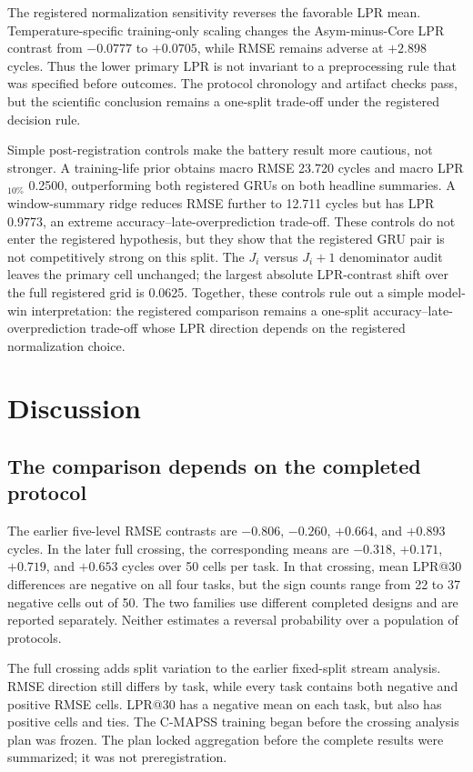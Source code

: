 \documentclass[preprint,12pt,numbers,sort&compress]{elsarticle}
\begin{document}
The registered normalization sensitivity reverses the favorable LPR mean. Temperature-specific training-only scaling changes the Asym-minus-Core LPR contrast from $-0.0777$ to $+0.0705$, while RMSE remains adverse at $+2.898$ cycles. Thus the lower primary LPR is not invariant to a preprocessing rule that was specified before outcomes. The protocol chronology and artifact checks pass, but the scientific conclusion remains a one-split trade-off under the registered decision rule.

Simple post-registration controls make the battery result more cautious, not stronger. A training-life prior obtains macro RMSE 23.720 cycles and macro LPR$_{10\%}$ 0.2500, outperforming both registered GRUs on both headline summaries. A window-summary ridge reduces RMSE further to 12.711 cycles but has LPR 0.9773, an extreme accuracy--late-overprediction trade-off. These controls do not enter the registered hypothesis, but they show that the registered GRU pair is not competitively strong on this split. The $J_i$ versus $J_i+1$ denominator audit leaves the primary cell unchanged; the largest absolute LPR-contrast shift over the full registered grid is 0.0625. Together, these controls rule out a simple model-win interpretation: the registered comparison remains a one-split accuracy--late-overprediction trade-off whose LPR direction depends on the registered normalization choice.



\section{Discussion}

\subsection{The comparison depends on the completed protocol}

The earlier five-level RMSE contrasts are $-0.806$, $-0.260$, $+0.664$, and $+0.893$ cycles. In the later full crossing, the corresponding means are $-0.318$, $+0.171$, $+0.719$, and $+0.653$ cycles over 50 cells per task. In that crossing, mean LPR@30 differences are negative on all four tasks, but the sign counts range from 22 to 37 negative cells out of 50. The two families use different completed designs and are reported separately. Neither estimates a reversal probability over a population of protocols.

The full crossing adds split variation to the earlier fixed-split stream analysis. RMSE direction still differs by task, while every task contains both negative and positive RMSE cells. LPR@30 has a negative mean on each task, but also has positive cells and ties. The C-MAPSS training began before the crossing analysis plan was frozen. The plan locked aggregation before the complete results were summarized; it was not preregistration.
\end{document}
